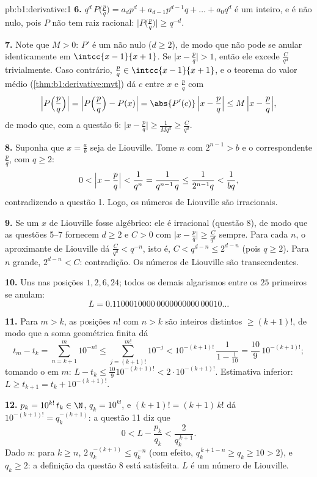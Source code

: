 \begin{solution}{pb:b1:derivative:1}
\textbf{6.} $q^d\,P\bigl(\frac pq\bigr) = a_d p^d + a_{d-1}
p^{d-1} q + \dots + a_0 q^d$ é um inteiro, e é não nulo,
pois $P$ não tem raiz racional: $\bigl|P\bigl(\frac
pq\bigr)\bigr| \geq q^{-d}$.

\textbf{7.} Note que $M > 0$: $P'$ é um  não nulo ($d \geq
2$), de modo que não pode se anular identicamente em
$\intcc{x-1}{x+1}$. Se $\bigl|x - \frac pq\bigr| > 1$, então ele
excede $\frac{C}{q^d}$ trivialmente. Caso contrário, $\frac pq \in
\intcc{x-1}{x+1}$, e o teorema do valor médio
(\cref{thm:b1:derivative:mvt}) dá $c$ entre $x$ e
$\frac pq$ com
\[
\Bigl|P\Bigl(\frac pq\Bigr)\Bigr|
= \Bigl|P\Bigl(\frac pq\Bigr) - P(x)\Bigr|
= \abs{P'(c)}\,\Bigl|x - \frac pq\Bigr|
\leq M\,\Bigl|x - \frac pq\Bigr| ,
\]
de modo que, com a questão 6: $\bigl|x - \frac pq\bigr| \geq
\frac{1}{Mq^d} \geq \frac{C}{q^d}$.

\textbf{8.} Suponha que $x = \frac ab$ seja de Liouville. Tome $n$ com
$2^{n-1} > b$ e o correspondente $\frac pq$, com $q \geq 2$:
\[
0 < \Bigl|x - \frac pq\Bigr| < \frac{1}{q^n}
= \frac{1}{q^{n-1}\,q} \leq \frac{1}{2^{n-1} q} <
\frac{1}{bq} ,
\]
contradizendo a questão 1. Logo, os números de Liouville são irracionais.

\textbf{9.} Se um $x$ de Liouville fosse algébrico: ele é irracional
(questão 8), de modo que as questões 5--7 fornecem $d \geq 2$ e $C > 0$
com $\bigl|x - \frac pq\bigr| \geq \frac{C}{q^d}$ sempre. Para
cada $n$, o aproximante de Liouville dá $\frac{C}{q^d} <
q^{-n}$, isto é, $C < q^{d-n} \leq 2^{d-n}$ (pois $q \geq 2$). Para
$n$ grande, $2^{d-n} < C$: contradição. Os números de Liouville são
transcendentes.

\textbf{10.} Uns nas posições $1, 2, 6, 24$; todos os demais algarismos
entre os $25$ primeiros se anulam:
\[
L = 0.1100010000\,0000000000\,00010\dots
\]

\textbf{11.} Para $m > k$, as posições $n!$ com $n > k$ são
inteiros distintos $\geq (k+1)!$, de modo que a soma geométrica finita
dá
\[
t_m - t_k = \sum_{n=k+1}^{m} 10^{-n!}
\leq \sum_{j = (k+1)!}^{m!} 10^{-j}
< 10^{-(k+1)!}\,\frac{1}{1 - \frac1{10}}
= \frac{10}{9}\,10^{-(k+1)!} ;
\]
tomando o  em $m$: $L - t_k \leq
\frac{10}{9}10^{-(k+1)!} < 2\cdot10^{-(k+1)!}$. Estimativa inferior: $L
\geq t_{k+1} = t_k + 10^{-(k+1)!}$.

\textbf{12.} $p_k = 10^{k!}\,t_k \in \N$, $q_k = 10^{k!}$, e
$(k+1)! = (k+1)\,k!$ dá $10^{-(k+1)!} = q_k^{-(k+1)}$:
a questão 11 diz que
\[
0 < L - \frac{p_k}{q_k} < \frac{2}{q_k^{\,k+1}} .
\]
Dado $n$: para $k \geq n$, $2\,q_k^{-(k+1)} \leq q_k^{-n}$
(com efeito, $q_k^{\,k+1-n} \geq q_k \geq 10 > 2$), e $q_k \geq 2$:
a definição da questão 8 está satisfeita. $L$ é um número de Liouville.


\end{solution}
